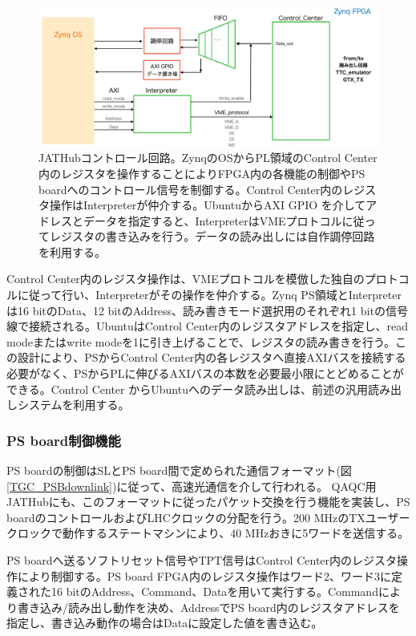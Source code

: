 \begin{figure} 
\centering
\includegraphics[width=16cm]{fig/QAQC/JATHubccenter.png}
\caption[JATHubコントロール回路]{JATHubコントロール回路。ZynqのOSからPL領域のControl Center内のレジスタを操作することによりFPGA内の各機能の制御やPS boardへのコントロール信号を制御する。Control Center内のレジスタ操作はInterpreterが仲介する。UbuntuからAXI GPIO を介してアドレスとデータを指定すると、InterpreterはVMEプロトコルに従ってレジスタの書き込みを行う。データの読み出しには自作調停回路を利用する。}
\label{JATHubccenter}
\end{figure}

Control Center内のレジスタ操作は、VMEプロトコルを模倣した独自のプロトコルに従って行い、Interpreterがその操作を仲介する。Zynq PS領域とInterpreterは16 bitのData、12 bitのAddress、読み書きモード選択用のそれぞれ1 bitの信号線で接続される。UbuntuはControl Center内のレジスタアドレスを指定し、read modeまたはwrite modeを1に引き上げることで、レジスタの読み書きを行う。この設計により、PSからControl Center内の各レジスタへ直接AXIバスを接続する必要がなく、PSからPLに伸びるAXIバスの本数を必要最小限にとどめることができる。Control Center からUbuntuへのデータ読み出しは、前述の汎用読み出しシステムを利用する。

\subsubsection{PS board制御機能}
PS boardの制御はSLとPS board間で定められた通信フォーマット(図\ref{TGC_PSBdownlink})に従って、高速光通信を介して行われる。
QAQC用JATHubにも、このフォーマットに従ったパケット交換を行う機能を実装し、PS boardのコントロールおよびLHCクロックの分配を行う。200 MHzのTXユーザークロックで動作するステートマシンにより、40 MHzおきに5ワードを送信する。

PS boardへ送るソフトリセット信号やTPT信号はControl Center内のレジスタ操作により制御する。PS board FPGA内のレジスタ操作はワード2、ワード3に定義された16 bitのAddress、Command、Dataを用いて実行する。Commandにより書き込み/読み出し動作を決め、AddressでPS board内のレジスタアドレスを指定し、書き込み動作の場合はDataに設定した値を書き込む。


